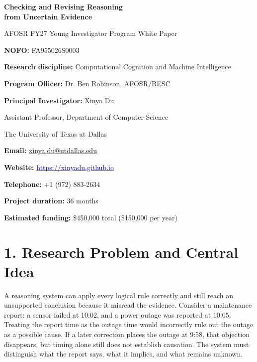 \documentclass[12pt]{article}
\begin{document}
\begin{titlepage}
\thispagestyle{empty}
\begin{center}
\vspace*{0.9in}
{\Large\bfseries Checking and Revising Reasoning\\from Uncertain Evidence\par}
\vspace{0.45in}
{\large AFOSR FY27 Young Investigator Program White Paper\par}
\vspace{0.5in}
\end{center}

\noindent\textbf{NOFO:} FA955026S0003\par
\noindent\textbf{Research discipline:} Computational Cognition and Machine Intelligence\par
\noindent\textbf{Program Officer:} Dr. Ben Robinson, AFOSR/RESC\par
\vspace{0.3in}
\noindent\textbf{Principal Investigator:} Xinya Du\par
\noindent Assistant Professor, Department of Computer Science\par
\noindent The University of Texas at Dallas\par
\noindent\textbf{Email:} \href{mailto:xinya.du@utdallas.edu}{xinya.du@utdallas.edu}\par
\noindent\textbf{Website:} \href{https://xinyadu.github.io}{\textcolor{blue}{https://xinyadu.github.io}}\par
\noindent\textbf{Telephone:} +1 (972) 883-2634\par
\vspace{0.3in}
\noindent\textbf{Project duration:} 36 months\par
\noindent\textbf{Estimated funding:} \$450,000 total (\$150,000 per year)\par
\vfill
\end{titlepage}

\setcounter{page}{1}
\hypersetup{pageanchor=true}

\section*{1. Research Problem and Central Idea}

A reasoning system can apply every logical rule correctly and still reach an unsupported conclusion because it misread the evidence. Consider a maintenance report: a sensor failed at 10:02, and a power outage was reported at 10:05. Treating the report time as the outage time would incorrectly rule out the outage as a possible cause. If a later correction places the outage at 9:58, that objection disappears, but timing alone still does not establish causation. The system must distinguish what the report says, what it implies, and what remains unknown.
\end{document}

